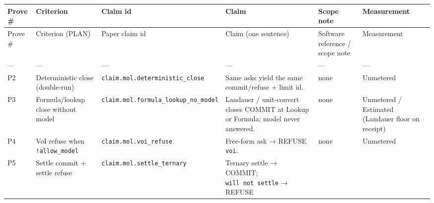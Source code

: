 \documentclass[
  10pt,
]{article}
\newcounter{none} %
\begin{document}
{\def\LTcaptype{none} %
\begin{longtable}[]{@{}
  >{\raggedright\arraybackslash}p{}
  >{\raggedright\arraybackslash}p{}
  >{\raggedright\arraybackslash}p{}
  >{\raggedright\arraybackslash}p{}
  >{\raggedright\arraybackslash}p{}
  >{\raggedright\arraybackslash}p{}@{}}
\toprule\noalign{}
\begin{minipage}[b]{\linewidth}\raggedright
Prove \#
\end{minipage} & \begin{minipage}[b]{\linewidth}\raggedright
Criterion
\end{minipage} & \begin{minipage}[b]{\linewidth}\raggedright
Claim id
\end{minipage} & \begin{minipage}[b]{\linewidth}\raggedright
Claim
\end{minipage} & \begin{minipage}[b]{\linewidth}\raggedright
Scope note
\end{minipage} & \begin{minipage}[b]{\linewidth}\raggedright
Measurement
\end{minipage} \\
\midrule\noalign{}
\endhead
\bottomrule\noalign{}
\endlastfoot
Prove \# & Criterion (PLAN) & Paper claim id & Claim (one sentence) &
Software reference / scope note & Measurement \\
--- & --- & --- & --- & --- & --- \\
P2 & Deterministic close (double-run) &
\texttt{claim.mol.deterministic\_close} & Same asks yield the same
commit/refuse + limit id. & none & Unmetered \\
P3 & Formula/lookup close without model &
\texttt{claim.mol.formula\_lookup\_no\_model} & Landauer / unit-convert
closes COMMIT at Lookup or Formula; model never answered. & none &
Unmetered / Estimated (Landauer floor on receipt) \\
P4 & VoI refuse when \texttt{!allow\_model} &
\texttt{claim.mol.voi\_refuse} & Free-form ask → REFUSE \texttt{voi}. &
none & Unmetered \\
P5 & Settle commit + settle refuse & \texttt{claim.mol.settle\_ternary}
& Ternary settle → COMMIT; \texttt{will\ not\ settle} → REFUSE

\end{longtable}}
\end{document}
